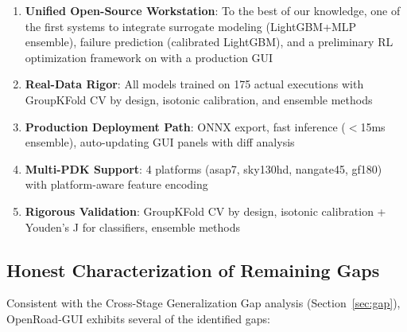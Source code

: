 \documentclass[10pt,conference]{IEEEtran}
\newcommand{\ORFS}{\text{ORFS}}
\begin{document}
\begin{table}[t]
\begin{enumerate}
    \item \textbf{Unified Open-Source Workstation}: To the best of our knowledge, one of the first systems to integrate surrogate modeling (LightGBM+MLP ensemble), failure prediction (calibrated LightGBM), and a preliminary RL optimization framework on \ORFS{} with a production GUI
    \item \textbf{Real-Data Rigor}: All models trained on 175 actual \ORFS{} executions with GroupKFold CV by design, isotonic calibration, and ensemble methods
    \item \textbf{Production Deployment Path}: ONNX export, fast inference ($<$15ms ensemble), auto-updating GUI panels with diff analysis
    \item \textbf{Multi-PDK Support}: 4 platforms (asap7, sky130hd, nangate45, gf180) with platform-aware feature encoding
    \item \textbf{Rigorous Validation}: GroupKFold CV by design, isotonic calibration + Youden's J for classifiers, ensemble methods
\end{enumerate}

\subsection{Honest Characterization of Remaining Gaps}

Consistent with the Cross-Stage Generalization Gap analysis (Section~\ref{sec:gap}), OpenRoad-GUI exhibits several of the identified gaps:


\end{table}
\end{document}
